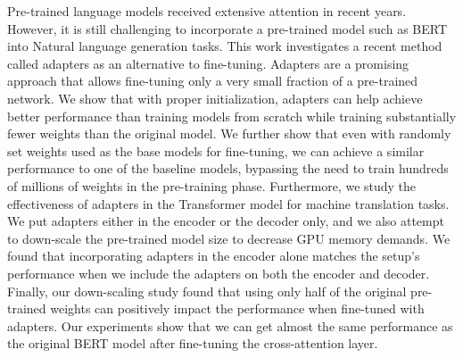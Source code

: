 Pre-trained language models received extensive attention in recent years. However, it is still challenging to incorporate a pre-trained model such as BERT into Natural language generation tasks. This work investigates a recent method called adapters as an alternative to fine-tuning. Adapters are a promising approach that allows fine-tuning only a very small fraction of a pre-trained network.
We show that with proper initialization, adapters can help achieve better performance than training models from scratch while training substantially fewer weights than the original model.
We further show that even with randomly set weights used as the base models for fine-tuning, we can achieve a similar performance to one of the baseline models, bypassing the need to train hundreds of millions of weights in the pre-training phase.
Furthermore, we study the effectiveness of adapters in the Transformer model for machine translation tasks. We put adapters either in the encoder or the decoder only, and we also attempt to down-scale the pre-trained model size to decrease GPU memory demands.
We found that incorporating adapters in the encoder alone matches the setup's performance when we include the adapters on both the encoder and decoder.
Finally, our down-scaling study found that using only half of the original pre-trained weights can positively impact the performance when fine-tuned with adapters. Our experiments show that we can get almost the same performance as the original BERT model after fine-tuning the cross-attention layer.